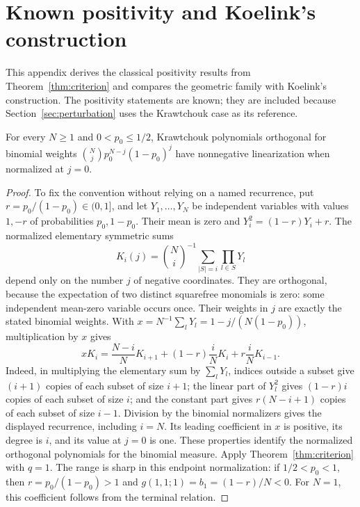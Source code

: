 \section{Known positivity and Koelink's construction}\label{sec:applications}
This appendix derives the classical positivity results from Theorem~\ref{thm:criterion} and compares the geometric family with Koelink's construction. The positivity statements are known; they are included because Section~\ref{sec:perturbation} uses the Krawtchouk case as its reference.
\begin{corollary}\label{cor:kraw}
For every $N\geq1$ and $0<p_0\leq1/2$, Krawtchouk polynomials orthogonal for binomial weights $\binom Nj p_0^{N-j}(1-p_0)^j$ have nonnegative linearization when normalized at $j=0$.
\end{corollary}
\begin{proof}
To fix the convention without relying on a named recurrence, put $r=p_0/(1-p_0)\in(0,1]$, and let $Y_1,\ldots,Y_N$ be independent variables with values $1,-r$ of probabilities $p_0,1-p_0$. Their mean is zero and $Y_i^2=(1-r)Y_i+r$. The normalized elementary symmetric sums
\[
K_i(j)=\binom Ni^{-1}\sum_{|S|=i}\prod_{l\in S}Y_l
\]
depend only on the number $j$ of negative coordinates. They are orthogonal, because the expectation of two distinct squarefree monomials is zero: some independent mean-zero variable occurs once. Their weights in $j$ are exactly the stated binomial weights. With $x=N^{-1}\sum_lY_l=1-j/(N(1-p_0))$, multiplication by $x$ gives
\[
xK_i=\frac{N-i}{N}K_{i+1}+(1-r)\frac iN K_i+r\frac iN K_{i-1}.
\]
Indeed, in multiplying the elementary sum by $\sum_lY_l$, indices outside a subset give $(i+1)$ copies of each subset of size $i+1$; the linear part of $Y_l^2$ gives $(1-r)i$ copies of each subset of size $i$; and the constant part gives $r(N-i+1)$ copies of each subset of size $i-1$. Division by the binomial normalizers gives the displayed recurrence, including $i=N$. Its leading coefficient in $x$ is positive, its degree is $i$, and its value at $j=0$ is one. These properties identify the normalized orthogonal polynomials for the binomial measure. Apply Theorem~\ref{thm:criterion} with $q=1$.
The range is sharp in this endpoint normalization: if $1/2<p_0<1$, then
$r=p_0/(1-p_0)>1$ and $g(1,1;1)=b_1=(1-r)/N<0$.
For $N=1$, this coefficient follows from the terminal relation.
\end{proof}


